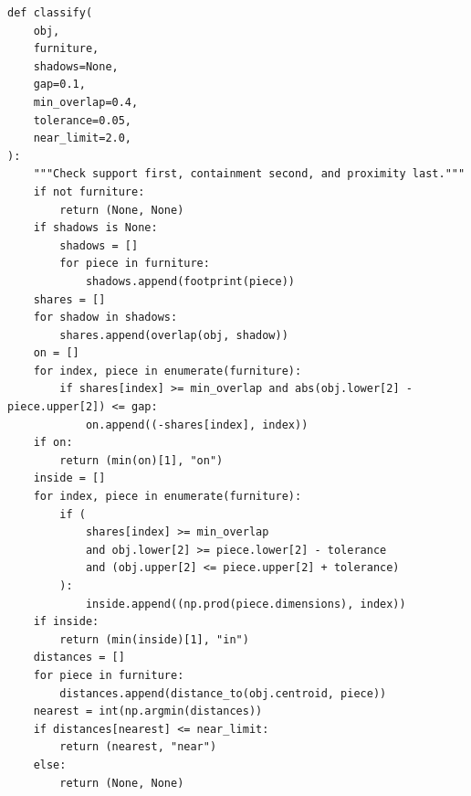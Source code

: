 \documentclass[11pt,a4paper]{book}
\begin{document}
\begin{lstlisting}[firstnumber=42]
def classify(
    obj,
    furniture,
    shadows=None,
    gap=0.1,
    min_overlap=0.4,
    tolerance=0.05,
    near_limit=2.0,
):
    """Check support first, containment second, and proximity last."""
    if not furniture:
        return (None, None)
    if shadows is None:
        shadows = []
        for piece in furniture:
            shadows.append(footprint(piece))
    shares = []
    for shadow in shadows:
        shares.append(overlap(obj, shadow))
    on = []
    for index, piece in enumerate(furniture):
        if shares[index] >= min_overlap and abs(obj.lower[2] - piece.upper[2]) <= gap:
            on.append((-shares[index], index))
    if on:
        return (min(on)[1], "on")
    inside = []
    for index, piece in enumerate(furniture):
        if (
            shares[index] >= min_overlap
            and obj.lower[2] >= piece.lower[2] - tolerance
            and (obj.upper[2] <= piece.upper[2] + tolerance)
        ):
            inside.append((np.prod(piece.dimensions), index))
    if inside:
        return (min(inside)[1], "in")
    distances = []
    for piece in furniture:
        distances.append(distance_to(obj.centroid, piece))
    nearest = int(np.argmin(distances))
    if distances[nearest] <= near_limit:
        return (nearest, "near")
    else:
        return (None, None)
\end{lstlisting}
\end{document}
